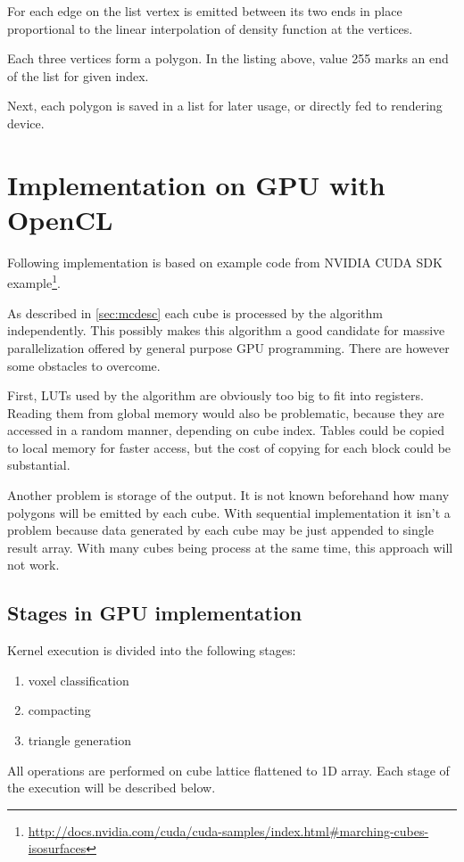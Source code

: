 For each edge on the list vertex is emitted between its two ends in place
proportional to the linear interpolation of density function at the vertices.

Each three vertices form a polygon. In the listing above, value 255 marks an end
of the list for given index.

Next, each polygon is saved in a list for later usage, or directly fed to
rendering device.

\section{Implementation on GPU with OpenCL}
\label{sec:mcgpu}
Following implementation is based on example code from NVIDIA CUDA SDK
example\footnote{\url{http://docs.nvidia.com/cuda/cuda-samples/index.html\#marching-cubes-isosurfaces}}.

As described in \autoref{sec:mcdesc} each cube is processed by the algorithm
independently. This possibly makes this algorithm a good candidate for massive
parallelization offered by general purpose GPU programming. There are however
some obstacles to overcome.

First, LUTs used by the algorithm are obviously too big to fit into registers.
Reading them from global memory would also be problematic, because they are
accessed in a random manner, depending on cube index. Tables could be copied
to local memory for faster access, but the cost of copying for each block could
be substantial.

Another problem is storage of the output. It is not known beforehand how many
polygons will be emitted by each cube. With sequential implementation it isn't a
problem because data generated by each cube may be just appended to single
result array. With many cubes being process at the same time, this approach
will not work.

\subsection{Stages in GPU implementation}
Kernel execution is divided into the following stages:
\begin{enumerate}
  \item voxel classification
  \item compacting
  \item triangle generation
\end{enumerate}

All operations are performed on cube lattice flattened to 1D array. Each stage
of the execution will be described below.

